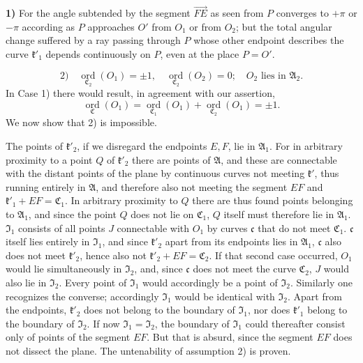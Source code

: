 \documentclass{article}
\begin{document}
\textbf{1)} For the angle subtended by the segment $\overrightarrow{FE}$ as seen from $P$ converges to $+\pi$ or $-\pi$ according as $P$ approaches $O'$ from $O_1$ or from $O_2$; but the total angular change suffered by a ray passing through $P$ whose other endpoint describes the curve $\mathfrak{k}'_1$ depends continuously on $P$, even at the place $P = O'$.

\[ 2) \quad \underset{\mathfrak{C}_2}{\operatorname{ord}} (O_1) = \pm 1, \quad \underset{\mathfrak{C}_2}{\operatorname{ord}} (O_2) = 0; \quad O_2 \text{ lies in } \mathfrak{A}_2. \]
In Case 1) there would result, in agreement with our assertion,
\[ \underset{\mathfrak{C}}{\operatorname{ord}} (O_1) = \underset{\mathfrak{C}_1}{\operatorname{ord}} (O_1) + \underset{\mathfrak{C}_2}{\operatorname{ord}} (O_1) = \pm 1. \]
We now show that 2) is impossible.

The points of $\mathfrak{k}'_2$, if we disregard the endpoints $E, F$, lie in $\mathfrak{A}_1$. For in arbitrary proximity to a point $Q$ of $\mathfrak{k}'_2$ there are points of $\mathfrak{A}$, and these are connectable with the distant points of the plane by continuous curves not meeting $\mathfrak{k}'$, thus running entirely in $\mathfrak{A}$, and therefore also not meeting the segment $EF$ and $\mathfrak{k}'_1 + EF = \mathfrak{C}_1$. In arbitrary proximity to $Q$ there are thus found points belonging to $\mathfrak{A}_1$, and since the point $Q$ does not lie on $\mathfrak{C}_1$, $Q$ itself must therefore lie in $\mathfrak{A}_1$. $\mathfrak{I}_1$ consists of all points $J$ connectable with $O_1$ by curves $\mathfrak{c}$ that do not meet $\mathfrak{C}_1$. $\mathfrak{c}$ itself lies entirely in $\mathfrak{I}_1$, and since $\mathfrak{k}'_2$ apart from its endpoints lies in $\mathfrak{A}_1$, $\mathfrak{c}$ also does not meet $\mathfrak{k}'_2$, hence also not $\mathfrak{k}'_2 + EF = \mathfrak{C}_2$. If that second case occurred, $O_1$ would lie simultaneously in $\mathfrak{I}_2$, and, since $\mathfrak{c}$ does not meet the curve $\mathfrak{C}_2$, $J$ would also lie in $\mathfrak{I}_2$. Every point of $\mathfrak{I}_1$ would accordingly be a point of $\mathfrak{I}_2$. Similarly one recognizes the converse; accordingly $\mathfrak{I}_1$ would be identical with $\mathfrak{I}_2$. Apart from the endpoints, $\mathfrak{k}'_2$ does not belong to the boundary of $\mathfrak{I}_1$, nor does $\mathfrak{k}'_1$ belong to the boundary of $\mathfrak{I}_2$. If now $\mathfrak{I}_1 = \mathfrak{I}_2$, the boundary of $\mathfrak{I}_1$ could thereafter consist only of points of the segment $EF$. But that is absurd, since the segment $EF$ does not dissect the plane. The untenability of assumption 2) is proven.
\end{document}
